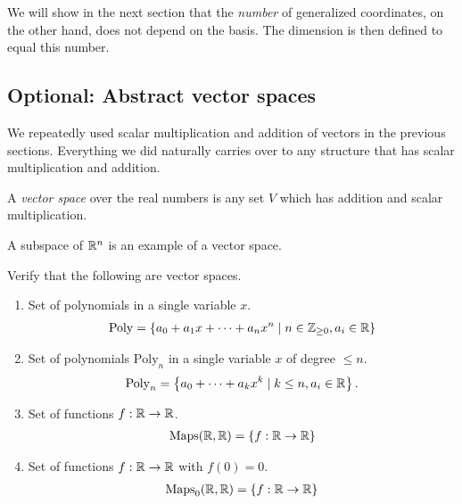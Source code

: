   We will show in the next section that the \emph{number} of generalized coordinates, on the other hand, does not depend on the basis. The dimension is then defined to equal this number.














\subsection{Optional: Abstract vector spaces}
We repeatedly used scalar multiplication and addition of vectors in the previous sections.
Everything we did naturally carries over to any structure that has scalar multiplication and addition.

\begin{definition}
  A \emph{vector space} over the real numbers is any set $V$ which has addition and scalar multiplication.
\end{definition}
\begin{ex}
  A subspace of $\mathbb{R}^n$ is an example of a vector space.
\end{ex}

\begin{qbox}
  Verify that the following are vector spaces.
  \begin{enumerate}
    \item Set of polynomials in a single variable $x$.
    \begin{align*}
      \mathrm{Poly} = \left\{a_0 + a_1 x + \dots + a_n x^n \mid n \in \mathbb{Z}_{\ge 0}, a_i \in \mathbb{R}\right\}
    \end{align*}
    \item Set of polynomials $\mathrm{Poly}_n$ in a single variable $x$ of degree $\le n$.
    \begin{equation*}
      \mathrm{Poly}_n = \left\{ a_0 + \dots + a_k x^k \mid k \le n, a_i \in \mathbb{R}\right\}.
    \end{equation*}
    \item Set of functions $f: \mathbb{R} \rightarrow \mathbb{R}$.
    \begin{align*}
      \operatorname{Maps}(\mathbb{R},\mathbb{R}) = \left\{f:\mathbb{R} \rightarrow \mathbb{R}\right\}
    \end{align*}
    \item Set of functions $f: \mathbb{R} \rightarrow \mathbb{R}$ with $f(0) = 0$.
    \begin{align*}
      \operatorname{Maps}_0(\mathbb{R},\mathbb{R}) = \left\{f:\mathbb{R} \rightarrow \mathbb{R}\right\}
    \end{align*}
  \end{enumerate}
\end{qbox}

